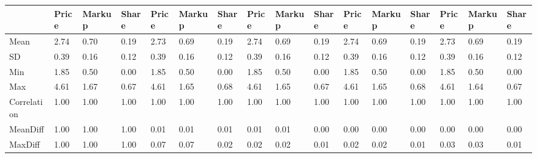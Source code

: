\begin{table}[htbp]
\begin{tabular}{llllllllllllllll} \hline \hline
 & Price  & Markup  & Share  & Price  & Markup  & Share  & Price  & Markup  & Share  & Price  & Markup  & Share  & Price  & Markup  & Share  \\  \hline 
Mean &      2.74 &      0.70 &      0.19 &      2.73 &      0.69 &      0.19 &      2.74 &      0.69 &      0.19 &      2.74 &      0.69 &      0.19 &      2.73 &      0.69 &      0.19 \\  
SD &      0.39 &      0.16 &      0.12 &      0.39 &      0.16 &      0.12 &      0.39 &      0.16 &      0.12 &      0.39 &      0.16 &      0.12 &      0.39 &      0.16 &      0.12 \\  
Min &      1.85 &      0.50 &      0.00 &      1.85 &      0.50 &      0.00 &      1.85 &      0.50 &      0.00 &      1.85 &      0.50 &      0.00 &      1.85 &      0.50 &      0.00 \\  
Max &      4.61 &      1.67 &      0.67 &      4.61 &      1.65 &      0.68 &      4.61 &      1.65 &      0.67 &      4.61 &      1.65 &      0.68 &      4.61 &      1.64 &      0.67 \\  
Correlation &      1.00 &      1.00 &      1.00 &      1.00 &      1.00 &      1.00 &      1.00 &      1.00 &      1.00 &      1.00 &      1.00 &      1.00 &      1.00 &      1.00 &      1.00 \\  
MeanDiff &      1.00 &      1.00 &      1.00 &      0.01 &      0.01 &      0.01 &      0.01 &      0.01 &      0.00 &      0.00 &      0.00 &      0.00 &      0.00 &      0.00 &      0.00 \\  
MaxDiff &      1.00 &      1.00 &      1.00 &      0.07 &      0.07 &      0.02 &      0.02 &      0.02 &      0.01 &      0.02 &      0.02 &      0.01 &      0.03 &      0.03 &      0.01 \\  
\hline \hline \end{tabular}
\end{table}
